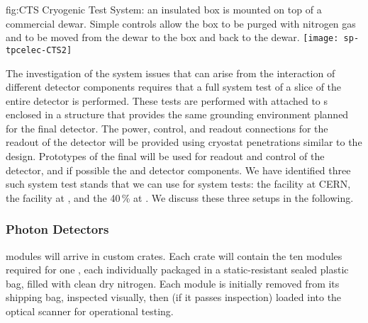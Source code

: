 \begin{dunefigure}
{fig:CTS}
{Cryogenic Test System: an insulated box is mounted on top of a commercial \lntwo dewar.  Simple controls allow the box to be purged with nitrogen gas and \lntwo to be moved from the dewar to the box and back to the dewar.}
\texttt{[image: sp-tpcelec-CTS2]}
\end{dunefigure}



The investigation of the system issues that can arise from the interaction 
of different detector components requires that a full system test of a slice
of the entire detector is performed. These tests are performed with 
attached to s enclosed in a structure that provides the same
grounding environment planned for the final  detector. The
power, control, and readout connections for the readout of the detector
will be provided using cryostat penetrations similar to the 
design. Prototypes of the final  will be used for readout and
control of the detector, and if possible the  and 
detector components. We have identified three such system test stands
that we can use for system tests: the  facility at CERN, the
 facility at , and the \num{40}\,\%  at .
We discuss these three setups in the following.


\subsubsection{Photon Detectors}

 modules will arrive %
in custom crates.  Each crate will contain the ten modules required for one , each individually packaged in a static-resistant sealed plastic bag, filled with clean dry nitrogen. Each  module is initially removed from its shipping bag, inspected visually, then (if it passes inspection) loaded into the optical scanner for operational testing.



